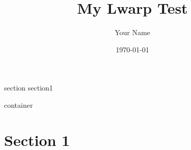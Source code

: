 \documentclass{article}
\title{My Lwarp Test}
\author{Your Name}
\date{\today}
\begin{document}
\begin{BlockClass}{section section1} %
    \begin{BlockClass}{container}
    \section*{Section 1} %
    \end{BlockClass}
\end{BlockClass}
\end{document}
